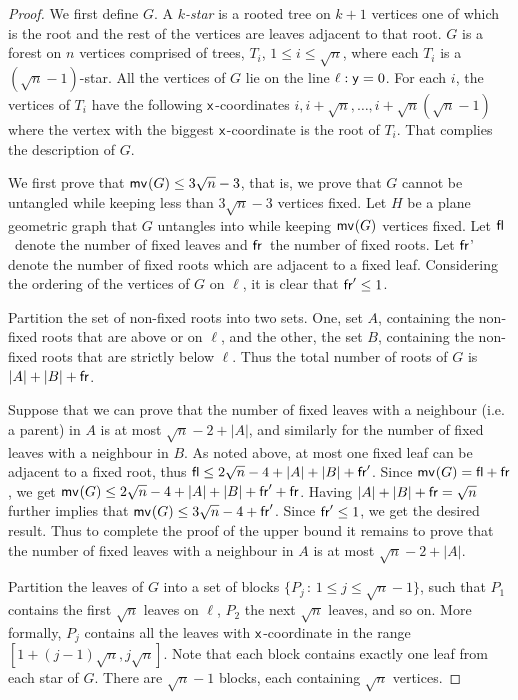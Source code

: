 \documentclass[lotsofwhite,charterfonts, letter]{patmorin}
\newcommand{\x}{\ensuremath{\protect\textup{\textsf{x}}}}
\newcommand{\y}{\ensuremath{\protect\textup{\textsf{y}}}}
\newcommand{\fl}{\ensuremath{\protect\textup{\textsf{fl}}}}
\newcommand{\fr}{\ensuremath{\protect\textup{\textsf{fr}}}}
\newcommand{\mv}[2][]{\ensuremath{\textup{\textsf{mv}}_{#1}(#2)}}
\begin{document}
\begin{proof}
We first define $G$. A \emph{$k$-star} is a rooted tree on $k+1$ vertices one of which is the root and the rest of the vertices are leaves adjacent to that root. $G$ is a forest on $n$ vertices comprised of trees, $T_i$, $1\leq i\leq \sqrt{n}$, where each $T_i$ is a $(\sqrt{n}-1)$-star. All the vertices of $G$ lie on the line $\ell: \y=0$. For each $i$, the vertices of $T_i$ have the following \x-coordinates $i, i+\sqrt{n}, \dots, i+\sqrt{n}(\sqrt{n}-1)$ where the vertex with the biggest \x-coordinate is the root of $T_i$. That complies the description of $G$.


We first prove that $\mv{G}\leq 3\sqrt{n}-3$, that is, we prove that $G$ cannot be untangled while keeping less than $3\sqrt{n}-3$ vertices fixed. Let $H$ be a plane geometric graph that $G$ untangles into while keeping $\mv{G}$ vertices fixed. Let \fl\ denote the number of fixed leaves and \fr\ the number of fixed roots. Let \fr' denote the number of fixed roots which are adjacent to a fixed leaf. Considering the ordering of the vertices of $G$ on $\ell$, it is clear that $\fr'\leq 1$.

Partition the set of non-fixed roots into two sets. One, set $A$, containing the non-fixed roots that are above or on $\ell$, and the other, the set $B$, containing the non-fixed roots that are strictly below $\ell$. Thus the total number of roots of $G$ is $|A|+|B|+ \fr$.

Suppose that we can prove that the number of fixed leaves with a neighbour (i.e. a parent) in $A$ is at most $\sqrt{n}-2+|A|$, and similarly for the number of fixed leaves with a neighbour in $B$. As noted above, at most one fixed leaf can be adjacent to a fixed root, thus $\fl\leq 2\sqrt{n}-4 +|A|+|B| + \fr'$. Since $\mv{G}= \fl+\fr$, we get $\mv{G}\leq 2\sqrt{n}-4 +|A|+|B|+ \fr'+ \fr$. Having $|A|+|B|+\fr=\sqrt{n}$ further implies that $\mv{G}\leq 3\sqrt{n}-4 + \fr'$. Since $\fr'\leq 1$, we get the desired result. Thus to complete the proof of the upper bound it remains to prove that the number of fixed leaves with a neighbour in $A$ is at most $\sqrt{n}-2+|A|$.

Partition the leaves of $G$ into a set of blocks $\{P_j\,:\, 1\leq j\leq \sqrt{n}-1\}$, such that $P_1$ contains the first $\sqrt{n}$ leaves on $\ell$, $P_2$ the next $\sqrt{n}$ leaves, and so on. More formally, $P_j$ contains all the leaves  with \x-coordinate in the range  $[1+(j-1)\sqrt{n}, j\sqrt{n}]$. 
%
%
Note that each block contains exactly one leaf from each star of $G$. There are $\sqrt{n}-1$ blocks, each containing $\sqrt{n}$ vertices.


\end{proof}
\end{document}
